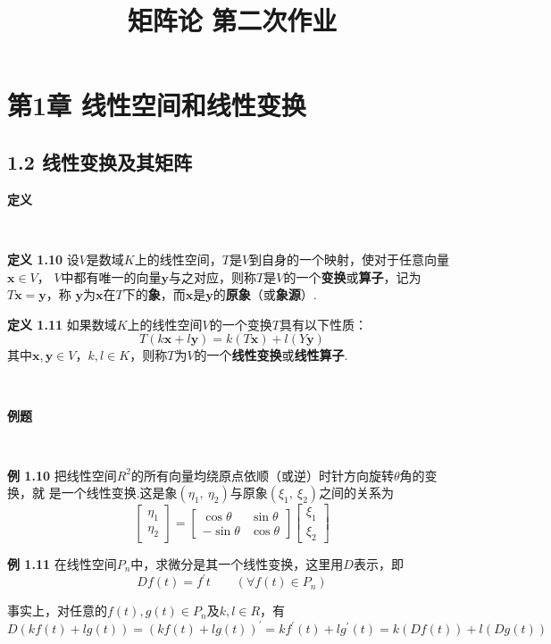\documentclass[12pt, a4paper, oneside, fontset=none]{ctexart}
\author{}
\date{}
\title{\vspace{-3em}\textbf{矩阵论 \quad 第二次作业}\vspace{-3em}}
\begin{document}
\maketitle

\section*{第1章 \quad 线性空间和线性变换}

\subsection*{1.2 \quad 线性变换及其矩阵}

\centerline{\large{\textbf{定义}}} \ \par

\textbf{定义 1.10} \quad 设$V$是数域$K$上的线性空间，$T$是$V$到自身的一个映射，使对于任意向量$\bm{x} \in V$，
$V$中都有唯一的向量$\bm{y}$与之对应，则称$T$是$V$的一个\textbf{变换}或\textbf{算子}，记为$T\bm{x = y}$，称
$\bm{y}$为$\bm{x}$在$T$下的\textbf{象}，而$\bm{x}$是$\bm{y}$的\textbf{原象}（或\textbf{象源}）.

\textbf{定义 1.11} \quad 如果数域$K$上的线性空间$V$的一个变换$T$具有以下性质：
$$
    T(k\bm{x} + l\bm{y}) = k(T\bm{x}) + l(Y\bm{y})
$$
其中$\bm{x,y} \in V$，$k, l \in K$，则称$T$为$V$的一个\textbf{线性变换}或\textbf{线性算子}. \par\ \par

\centerline{\large{\textbf{例题}}} \ \par

\textbf{例 1.10} \quad 把线性空间$R^2$的所有向量均绕原点依顺（或逆）时针方向旋转$\theta$角的变换，就
是一个线性变换.这是象$(\eta_1,\ \eta_2)$与原象$(\xi_1 ,\ \xi_2)$之间的关系为
$$
    \begin{bmatrix}
        \eta_1 \\
        \eta_2
    \end{bmatrix} = \begin{bmatrix}
        \cos\theta  & \sin\theta \\
        -\sin\theta & \cos\theta
    \end{bmatrix} \begin{bmatrix}
        \xi_1 \\
        \xi_2
    \end{bmatrix}
$$

\textbf{例 1.11} \quad 在线性空间$P_n$中，求微分是其一个线性变换，这里用$D$表示，即
$$
    Df(t) = f^{'}t \qquad (\forall f(t) \in P_n)
$$ \par
事实上，对任意的$f(t), g(t) \in P_n$及$k,l \in R$，有
$$
    D(kf(t) + lg(t)) = (kf(t) + lg(t))^{'} =
    kf^{'}(t) + lg^{'}(t) = k(Df(t)) + l(Dg(t))
$$
\end{document}
